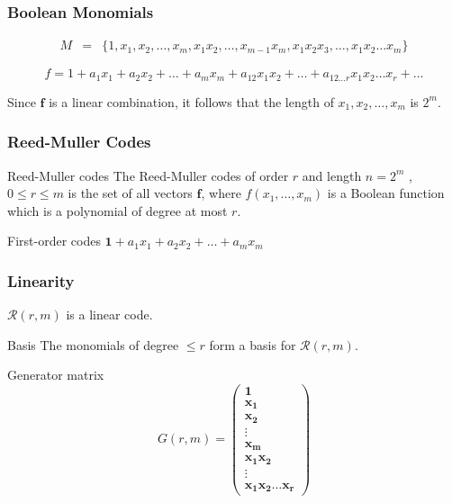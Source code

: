\message{ !name(1.tex)}\documentclass[xcolor=xvgnames]{beamer}
\newcommand{\RM}[2]{\ensuremath{\mathcal{R}(#1,#2)}}
\newcommand{\rem}{Reed-Muller}
\newcommand{\V}[1]{\ensuremath{\mathbf{#1}}}
\begin{document}


\begin{frame}
 \frametitle{Boolean Monomials}
\begin{eqnarray*}
M &=& \{1,x_1,x_2,\ldots,x_m, x_1x_2,\ldots,x_{m-1}x_m,x_1x_2x_3,\ldots,x_1x_2\ldots x_m\}
\end{eqnarray*}

\begin{equation*}
  f = 1 + a_1x_1+a_2x_2+\ldots+a_mx_m + a_{12}x_1x_2+\ldots+a_{12\ldots r}x_1x_2\ldots x_r+\ldots
\end{equation*}

Since $\V{f}$ is a linear combination, it follows that the length of $x_1, x_2,\ldots,x_m$ is $2^m$.
\end{frame}



\begin{frame}
 \frametitle{Reed-Muller Codes}

\begin{block}{Reed-Muller codes}
The \alert{\rem{} codes} of order $r$ and length $n = 2^m$ ,$0 \leq r \leq m$  is the set of all vectors $\V{f}$, where $f(x_1,\ldots,x_m)$ is a Boolean function which is a polynomial of degree at most $r$.
\end{block}

\begin{block}{First-order codes}
 $\V{1}+a_1x_1+a_2x_2+\ldots+a_mx_m$
\end{block}
\end{frame}


\begin{frame}
 \frametitle{Linearity}
\begin{Lemma}
  $\RM{r}{m}$ is a linear code.
\end{Lemma}

\begin{block}{Basis}
  The monomials of degree $\leq r$ form a basis for $\RM{r}{m}$.
\end{block}

Generator matrix
\begin{equation}
  \label{eq:5}
  G(r,m) =
  \begin{pmatrix}
    \V{1} \\
    \V{x_1} \\
    \V{x_2} \\
    \vdots \\
    \V{x_m} \\
    \V{x_1x_2} \\
    \vdots \\
    \V{x_1x_2\ldots x_r}
  \end{pmatrix}
\end{equation}

\end{frame}
\end{document}
